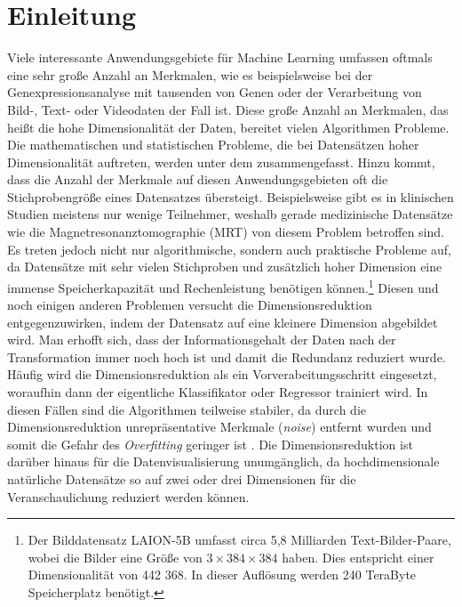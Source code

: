 \chapter{Einleitung}
\label{ch:Enleitung}

Viele interessante Anwendungsgebiete für Machine Learning umfassen oftmals eine sehr große Anzahl
an Merkmalen, wie es beispielsweise bei der Genexpressionsanalyse mit tausenden von Genen \parencite{Parmigiani.2003} oder der Verarbeitung von Bild-, Text- oder Videodaten der Fall ist. Diese
große Anzahl an Merkmalen, das heißt die hohe Dimensionalität der Daten, bereitet vielen
Algorithmen Probleme. Die mathematischen und statistischen Probleme, die bei Datensätzen hoher
Dimensionalität auftreten, werden unter dem  \parencite{Aggarwal.2001} zusammengefasst. Hinzu kommt, dass die Anzahl der Merkmale auf diesen
Anwendungsgebieten oft die Stichprobengröße eines Datensatzes übersteigt. Beispielsweise gibt es in
klinischen Studien meistens nur wenige Teilnehmer, weshalb gerade medizinische Datensätze wie die
Magnetresonanztomographie (MRT) von diesem Problem betroffen sind. Es treten jedoch nicht nur
algorithmische, sondern auch praktische Probleme auf, da Datensätze mit sehr vielen Stichproben und
zusätzlich hoher Dimension eine immense Speicherkapazität und Rechenleistung benötigen
können.\footnote{Der Bilddatensatz LAION-5B umfasst circa 5,8 Milliarden Text-Bilder-Paare, wobei
	die Bilder eine Größe von $3 \times 384 \times 384$ haben. Dies entspricht einer Dimensionalität
	von 442 368. In dieser Auflösung werden 240 TeraByte Speicherplatz benötigt.}
Diesen und noch einigen anderen Problemen versucht die Dimensionsreduktion entgegenzuwirken, indem
der Datensatz auf eine kleinere Dimension abgebildet wird. Man erhofft sich, dass der
Informationsgehalt der Daten nach der Transformation immer noch hoch ist und damit die Redundanz
reduziert wurde. Häufig wird die Dimensionsreduktion als ein Vorverabeitungsschritt eingesetzt,
woraufhin dann der eigentliche Klassifikator oder Regressor trainiert wird. In diesen Fällen sind
die Algorithmen teilweise stabiler, da durch die Dimensionsreduktion unrepräsentative Merkmale
(\textit{noise}) entfernt wurden und somit die Gefahr des \textit{Overfitting} geringer ist \parencites[siehe]{Plastria.2008}{MustafaAbdulSalam.2021}. Die Dimensionsreduktion ist darüber hinaus
für die Datenvisualisierung unumgänglich, da hochdimensionale natürliche Datensätze so auf zwei
oder drei Dimensionen für die Veranschaulichung reduziert werden können.

